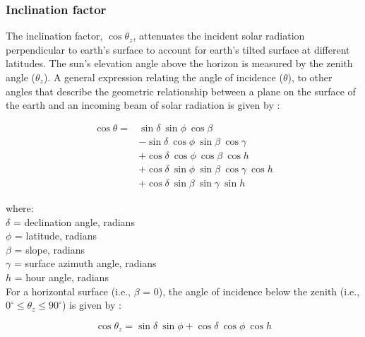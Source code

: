 \subsubsection{Inclination factor}
\label{sec:cosz}
The inclination factor, $\cos \theta_z$, attenuates the incident solar radiation perpendicular to earth's surface to account for earth's tilted surface at different latitudes. 
The sun's elevation angle above the horizon is measured by the zenith angle ($\theta_z$). 
A general expression relating the angle of incidence ($\theta$), to other angles that describe the geometric relationship between a plane on the surface of the earth and an incoming beam of solar radiation is given by \parencite[Eq. 1.6.2]{duffie13}:

\begin{equation}
\label{eq:theta}
    \begin{split}
    	\cos \theta = & \sin\delta\: \sin\phi\: \cos\beta \\
            & - \sin\delta\: \cos\phi\: \sin\beta\: \cos\gamma \\
            & + \cos\delta\: \cos\phi\: \cos\beta\: \cos h \\
            & + \cos\delta\: \sin\phi\: \sin\beta\: \cos\gamma\: \cos h \\
            & + \cos\delta\: \sin\beta\: \sin\gamma\: \sin h
    \end{split}
\end{equation}

\noindent where: \\
\indent $\delta$ = declination angle, radians \\
\indent $\phi$ = latitude, radians \\
\indent $\beta$ = slope, radians \\
\indent $\gamma$ = surface azimuth angle, radians \\
\indent $h$ = hour angle, radians \\

For a horizontal surface (i.e., $\beta$ = 0), the angle of incidence below the zenith (i.e., $0^{\circ} \leq \theta_z \leq 90^{\circ}$) is given by \parencite{wetherald72, duffie13, loutre03}:

\begin{equation}
\label{eq:thetaz}
	\cos \theta_z = \sin\delta\: \sin\phi + 
	                \cos\delta\: \cos\phi\: \cos h
\end{equation}

